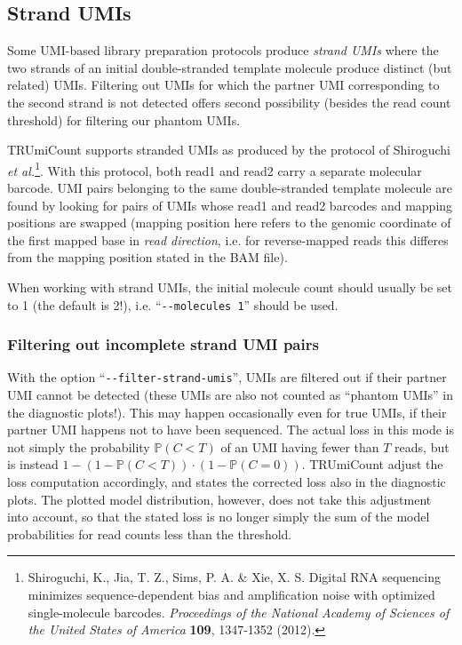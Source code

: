 \documentclass[10pt]{article}
\newcommand{\ddarg}[1]{\texttt{-{}-#1}}
\begin{document}
\pagebreak
\subsection{Strand UMIs}\label{strand-umis}

Some UMI-based library preparation protocols produce \emph{strand UMIs} where the two strands of an initial double-stranded template molecule produce distinct (but related) UMIs. Filtering out UMIs for which the partner UMI corresponding to the second strand is not detected offers second possibility (besides the read count threshold) for filtering our phantom UMIs.

TRUmiCount supports stranded UMIs as produced by the protocol of Shiroguchi \textit{et al.}\footnote{Shiroguchi, K., Jia, T. Z., Sims, P. A. \& Xie, X. S. Digital RNA sequencing minimizes sequence-dependent bias and amplification noise with optimized single-molecule barcodes. \textit{Proceedings of the National Academy of Sciences of the United States of America} \textbf{109}, 1347-1352 (2012).}. With this protocol, both read1 and read2 carry a separate molecular barcode. UMI pairs belonging to the same double-stranded template molecule are found by looking for pairs of UMIs whose read1 and read2 barcodes and mapping positions are swapped (mapping position here refers to the genomic coordinate of the first mapped base in \emph{read direction}, i.e. for reverse-mapped reads this differes from the mapping position stated in the BAM file).

When working with strand UMIs, the initial molecule count should usually be set to 1 (the default is 2!), i.e. ``\ddarg{molecules 1}'' should be used.

\subsubsection*{Filtering out incomplete strand UMI pairs}

With the option ``\ddarg{filter-strand-umis}'', UMIs are filtered out if their partner UMI cannot be detected (these UMIs are also not counted as ``phantom UMIs'' in the diagnostic plots!). This may happen occasionally even for true UMIs, if their partner UMI happens not to have been sequenced. The actual loss in this mode is not simply the probability $\mathbb{P}(C < T)$ of an UMI having fewer than $T$ reads, but is instead $1 - (1 - \mathbb{P}(C < T))\cdot (1 - \mathbb{P}(C=0))$. TRUmiCount adjust the loss computation accordingly, and states the corrected loss also in the diagnostic plots. The plotted model distribution, however, does not take this adjustment into account, so that the stated loss is no longer simply the sum of the model probabilities for read counts less than the threshold.
\end{document}

